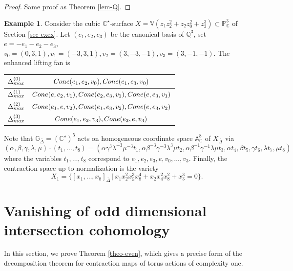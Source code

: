 \documentclass[11pt, reqno]{amsart}
\theoremstyle{plain}
\theoremstyle{definition}
\newtheorem{example}[theorem]{Example}
\theoremstyle{remark}
\begin{document}
\begin{proof}
Same proof as Theorem \ref{lem-Q}. 
\end{proof}
\begin{example}
Consider the cubic $\mathbb{C}^{\star}$-surface $X  =  \mathbb{V}(z_{1}z_{2}^{2} + z_{2}z_{0}^{2}  + z_{3}^{3})\subset \mathbb{P}^{3}_{\mathbb{C}}$ of Section \ref{sec-exex}. Let $(e_{1},e_{2},e_{3})$ be the canonical basis of $\mathbb{Q}^{3}$, set $e =  -e_{1}-e_{2}-e_{3}$,
$v_{0} =  (0,3,1), v_{1} =  (-3, 3, 1), v_{2} =  (3,-3,-1), v_{3} =  (3, -1,-1).$
The enhanced lifting fan is 
\begin{center}
 \begin{tabular}{|c| c |} 
 \hline
 $\Delta^{(0)}_{\rm max}$ &  ${\rm Cone}(e_{1} , e_{2} ,v_{0}), {\rm Cone}(e_{1}, e_{3},v_{0})$ \\ [2ex] 
 \hline
  $\Delta^{(1)}_{\rm max}$ & ${\rm Cone}(e, e_{2}, v_{1}),{\rm Cone}(e_{2}, e_{3},v_{1}),  {\rm Cone}(e, e_{3}, v_{1})$  \\  [2ex] 
 \hline
  $\Delta^{(2)}_{\rm max}$ & ${\rm Cone}(e_{1}, e, v_{2}), {\rm Cone}(e_{1}, e_{3}, v_{2}), {\rm Cone}(e, e_{3}, v_{2})$  \\ [2ex] 
 \hline
  $\Delta^{(3)}_{\rm max}$ &${\rm Cone}(e_{1}, e_{2}, v_{3}), {\rm Cone}(e_{2}, e, v_{3})$  \\ [2ex] 
 \hline
\end{tabular}
\end{center}
Note that $\mathbb{G}_{\bar{\Delta}} =  (\mathbb{C}^{\star})^{5}$ acts on homogeneous coordinate space $\mathbb{A}^{8}_{\mathbb{C}}$ of $X_{\bar{\Delta}}$ via 
$$(\alpha, \beta, \gamma, \lambda, \mu)\cdot (t_{1}, \ldots, t_{8}) =  (\alpha\gamma^{3}\lambda^{-3}\mu^{-3}t_{1}, \alpha\beta^{-3}\gamma^{-3}\lambda ^{3}\mu t_{2}, \alpha \beta^{-1}\gamma^{-1}\lambda \mu t_{3}, \alpha t_{4}, \beta t_{5}, \gamma t_{6}, \lambda t_{7}, \mu t_{8})$$
where the variables $t_{1}, \ldots, t_{8}$ correspond to $e_{1},e_{2}, e_{3}, e, v_{0},\ldots, v_{3}$. 
Finally, the contraction space up to normalization is the variety
$$X_{1} =  \{ [x_{1}, \ldots, x_{8}]_{\bar{\Delta}}\,|\, x_{1}x_{2}^{2}x_{5}^{3}x_{8}^{4} +  x_{2}x_{4}^{2}x_{8}^{2} + x_{3}^{3} = 0\}.$$
\end{example}

\section{Vanishing of odd dimensional intersection cohomology}\label{sec-five}
In this section, we prove Theorem \ref{theo-even}, which
 gives a precise form of the decomposition theorem for 
 contraction maps of torus actions of complexity one. 
\end{document}
